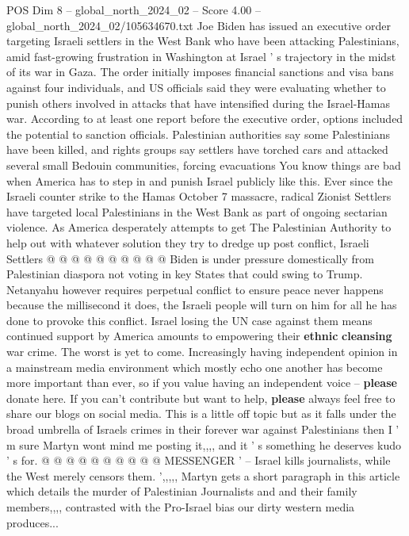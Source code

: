 \begin{textsample}{POS Dim 8 – global\_north\_2024\_02 – Score 4.00 – global\_north\_2024\_02/105634670.txt}  \label{ex:f8_pos_217}
Joe Biden has issued an executive order targeting Israeli settlers in the West Bank who have been attacking Palestinians, amid fast-growing frustration in Washington at Israel ' s trajectory in the midst of its war in Gaza.
The order initially imposes financial sanctions and visa bans against four individuals, and US officials said they were evaluating whether to punish others involved in attacks that have intensified during the Israel-Hamas war.
According to at least one report before the executive order, options included the potential to sanction officials.
Palestinian authorities say some Palestinians have been killed, and rights groups say settlers have torched cars and attacked several small Bedouin communities, forcing evacuations You know things are bad when America has to step in and punish Israel publicly like this.
Ever since the Israeli counter strike to the Hamas October 7 massacre, radical Zionist Settlers have targeted local Palestinians in the West Bank as part of ongoing sectarian violence.
As America desperately attempts to get The Palestinian Authority to help out with whatever solution they try to dredge up post conflict, Israeli Settlers @ @ @ @ @ @ @ @ @ @ Biden is under pressure domestically from Palestinian diaspora not voting in key States that could swing to Trump.
Netanyahu however requires perpetual conflict to ensure peace never happens because the millisecond it does, the Israeli people will turn on him for all he has done to provoke this conflict.
Israel losing the UN case against them means continued support by America amounts to empowering their \textbf{ethnic} \textbf{cleansing} war crime.
The worst is yet to come.
Increasingly having independent opinion in a mainstream media environment which mostly echo one another has become more important than ever, so if you value having an independent voice -- \textbf{please} donate here.
If you can't contribute but want to help, \textbf{please} always feel free to share our blogs on social media.
This is a little off topic but as it falls under the broad umbrella of Israels crimes in their forever war against Palestinians then I ' m sure Martyn wont mind me posting it,,,, and it ' s something he deserves kudo ' s for. @ @ @ @ @ @ @ @ @ @ MESSENGER ' -- Israel kills journalists, while the West merely censors them. ',,,,, Martyn gets a short paragraph in this article which details the murder of Palestinian Journalists and and their family members,,,, contrasted with the Pro-Israel bias our dirty western media produces...

\end{textsample}
